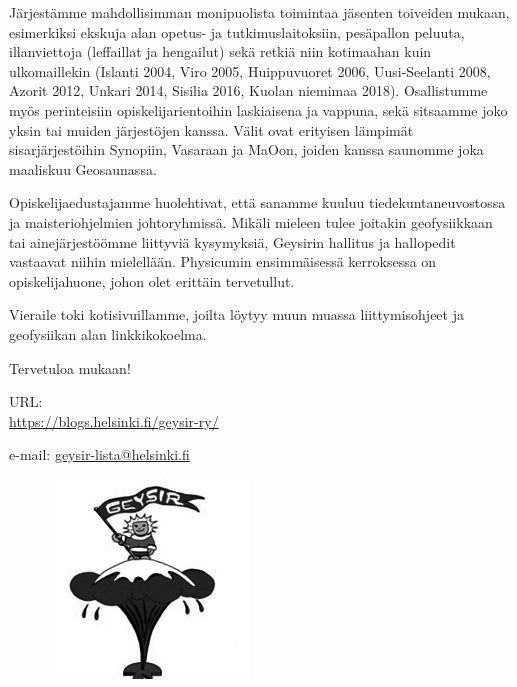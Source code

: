 \documentclass[a5paper, 8pt, twocolumn]{book} %
\numberwithin{equation}{section}
\begin{document}
Järjestämme mahdollisimman moni\-puolista
toimintaa jäsenten toiveiden mukaan,
esimerkiksi ekskuja alan opetus- ja tutkimus\-laitoksiin,
pesäpallon peluuta, illanviettoja (leffa\-illat ja
hengailut) sekä retkiä niin kotimaahan kuin
ulkomaillekin (Islanti 2004, Viro 2005,
Huippuvuoret 2006, Uusi-Seelanti 2008,
Azorit 2012, Unkari 2014, Sisilia 2016, Kuolan niemimaa 2018). Osallistumme
myös perinteisiin opiskelija\-rientoihin laskiaisena
ja vappuna, sekä sitsaamme joko yksin tai muiden järjestöjen kanssa. Välit ovat erityisen lämpimät sisarjärjestöihin Synopiin, Vasaraan ja MaOon, joiden kanssa saunomme joka maaliskuu Geo\-saunassa.

Opiskelija\-edustajamme
huolehtivat, että sanamme kuuluu tiede\-kunta\-neuvostossa ja maisteri\-ohjelmien johto\-ryhmissä. Mikäli mieleen tulee joitakin geo\-fysiikkaan
tai aine\-järjestöömme liittyviä kysymyksiä,
Geysirin hallitus ja hall\-op\-edit vastaavat
niihin mielellään. Physicumin ensimmäisessä
kerroksessa on opiskelija\-huone, johon
olet erittäin terve\-tullut.

Vieraile toki kotisivuillamme, joilta löytyy
muun muassa liittymisohjeet ja geofysiikan
alan linkkikokoelma.

\noindent Tervetuloa mukaan!

\noindent URL: \\\url{https://blogs.helsinki.fi/geysir-ry/}

\noindent e-mail: \url{geysir-lista@helsinki.fi}

\begin{figure}[!b]
	\centering
	\includegraphics[width=0.8\columnwidth]{geysirlogo.png}
\end{figure}
\end{document}
